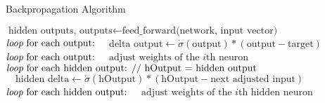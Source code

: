 \def\BState{\State\hskip-\ALG@thistlm}
\begin{algorithm}
\caption{Backpropagation Algorithm}\label{euclid}
\begin{algorithmic}[1]
\State $\text{hidden outputs, outputs}\gets\text{feed\_forward(network, input vector)}$
\State $\emph{loop}\text{ for each output:}$
\State $\enspace\enspace\text{delta output}\gets\dot \sigma(\text{output})*(\text{output}-\text{target})$
\State $\emph{loop}\text{ for each output:}$
\State $\enspace\enspace\text{adjust weights of the }i\text{th neuron}$
\State $\emph{loop}\text{ for each hidden output:  // hOutput = hidden output}$
\State $\enspace\enspace\text{hidden delta}\gets\dot \sigma(\text{hOutput})*(\text{hOutput}-\text{next adjusted input})$
\State $\emph{loop}\text{ for each hidden output:}$
\State $\enspace\enspace\text{adjust weights of the }i\text{th hidden neuron}$
\EndProcedure
\end{algorithmic}
\end{algorithm}